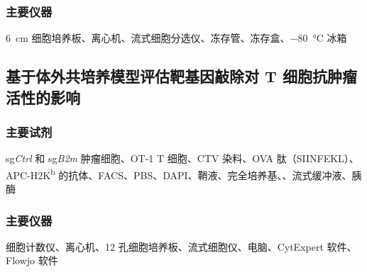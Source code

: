 \subsubsection{主要仪器}
\qty{6}{\cm} 细胞培养板、离心机、流式细胞分选仪、冻存管、冻存盒、\qty{-80}{\celsius} 冰箱

\subsection{基于体外共培养模型评估靶基因敲除对 T 细胞抗肿瘤活性的影响}
\subsubsection{主要试剂}
sg\textit{Ctrl} 和 sg\textit{B2m} 肿瘤细胞、OT-1 T 细胞、CTV 染料、OVA 肽（SIINFEKL）、APC-H2K\textsuperscript{b} 的抗体、FACS、PBS、DAPI、鞘液、完全培养基、、流式缓冲液、胰酶

\subsubsection{主要仪器}
细胞计数仪、离心机、12 孔细胞培养板、流式细胞仪、电脑、CytExpert 软件、Flowjo 软件

